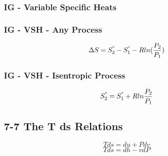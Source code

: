 \documentclass[10pt,landscape]{article}
\begin{document}
\begin{multicols}{3}
\subsubsection{IG - Variable Specific Heats}
\subsubsection{IG - VSH - Any Process}
\begin{equation}
    \Delta S = S_2^{\degree} - S_1^{\degree} - Rln(\frac{P_2}{P_1})
\end{equation}
\subsubsection{IG - VSH - Isentropic Process}
\begin{equation}
    S^\degree_2=S_1^\degree+Rln\frac{P_2}{P_1}
\end{equation}
\subsection{7-7 The T ds Relations}
\begin{equation}
    Tds=du+Pdv
\end{equation}
\begin{equation}
    Tds=dh-vdP
\end{equation}

\end{multicols}
\end{document}
